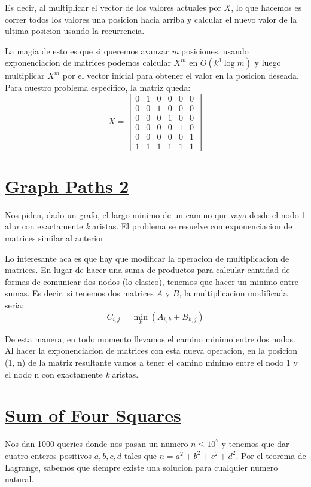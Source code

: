 \documentclass{article}
\begin{document}
Es decir, al multiplicar el vector de los valores actuales por $X$, lo que hacemos es correr todos los valores una posicion hacia arriba y calcular el nuevo valor de la ultima posicion usando la recurrencia.

La magia de esto es que si queremos avanzar \textit{m} posiciones, usando exponenciacion de matrices podemos calcular $X^m$ en $O(k^3 \log m)$ y luego multiplicar $X^m$ por el vector inicial para obtener el valor en la posicion deseada.
Para nuestro problema especifico, la matriz queda:
\[X = \begin{bmatrix}
0 & 1 & 0 & 0 & 0 & 0 \\
0 & 0 & 1 & 0 & 0 & 0 \\
0 & 0 & 0 & 1 & 0 & 0 \\
0 & 0 & 0 & 0 & 1 & 0 \\
0 & 0 & 0 & 0 & 0 & 1 \\
1 & 1 & 1 & 1 & 1 & 1
\end{bmatrix}\]

\section{\href{https://cses.fi/problemset/task/1724}{Graph Paths 2}}
Nos piden, dado un grafo, el largo minimo de un camino que vaya desde el nodo 1 al $n$ con exactamente \textit{k} aristas. El problema se resuelve con exponenciacion de matrices similar al anterior.

Lo interesante aca es que hay que modificar la operacion de multiplicacion de matrices. En lugar de hacer una suma de productos para calcular cantidad de formas de comunicar dos nodos (lo clasico), tenemos que hacer un minimo entre sumas. Es decir, si tenemos dos matrices $A$ y $B$, la multiplicacion modificada seria:
\[C_{i,j} = \min_{k}(A_{i,k} + B_{k,j})\]

De esta manera, en todo momento llevamos el camino minimo entre dos nodos. Al hacer la exponenciacion de matrices con esta nueva operacion, en la posicion (1, n) de la matriz resultante vamos a tener el camino minimo entre el nodo 1 y el nodo n con exactamente \textit{k} aristas.

\section{\href{https://cses.fi/problemset/task/3355}{Sum of Four Squares}}
Nos dan 1000 queries donde nos pasan un numero $n \leq 10^7$ y tenemos que dar cuatro enteros positivos $a, b, c, d$ tales que $n = a^2 + b^2 + c^2 + d^2$. Por el teorema de Lagrange, sabemos que siempre existe una solucion para cualquier numero natural. 
\end{document}

